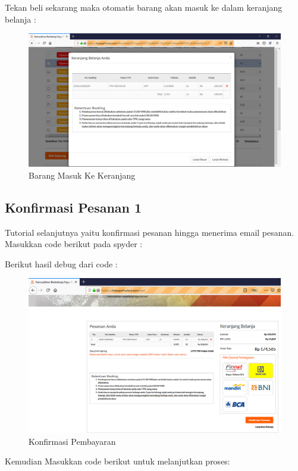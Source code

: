 \newpage
Tekan beli sekarang maka otomatis barang akan masuk ke dalam keranjang belanja :
\begin{figure}[h]
	\centering
	\includegraphics[scale=0.25]{figures/keranjangg}
	\caption{Barang Masuk Ke Keranjang}
\end{figure}

\subsection{Konfirmasi Pesanan 1}
Tutorial selanjutnya yaitu konfirmasi pesanan hingga menerima email pesanan. 
Masukkan code berikut pada spyder :


Berikut hasil debug dari code :
\begin{figure}[h]
 	\centering
 	\includegraphics[scale=0.26]{figures/bayar}
 	\caption{Konfirmasi Pembayaran}
\end{figure}
 
Kemudian Masukkan code berikut untuk melanjutkan proses:


